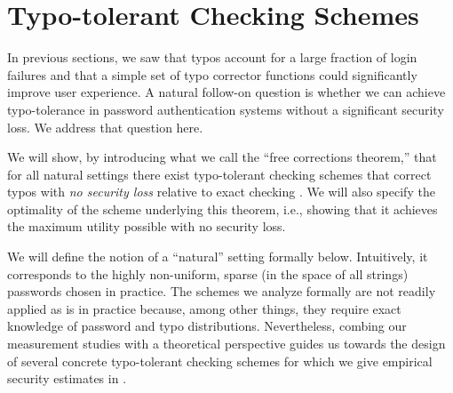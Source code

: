 \section{Typo-tolerant Checking Schemes}
\label{sec:formal}
\def\shift{\ensuremath{\langle s \rangle}}
\def\caps{\ensuremath{\langle c \rangle}}


In previous sections, we saw that typos account for a large fraction
of login failures and that a simple set of typo corrector functions
could significantly improve user experience. A natural follow-on
question is whether we can achieve typo-tolerance in password
authentication systems without a significant security loss.  We
address that question here.

We will show, by introducing what we call the ``free corrections
theorem,'' that for all natural settings there exist typo-tolerant
checking schemes that correct typos with \emph{no security loss}
relative to exact checking .  We will also specify the optimality of the scheme
underlying this theorem, i.e., showing that it achieves the maximum
utility possible with no security loss.

We will define the notion of a ``natural'' setting formally below. Intuitively, it corresponds to the
highly non-uniform, sparse (in the space of all strings) passwords chosen in practice.
The schemes we analyze formally are not readily applied as is in practice because, among other
things, they require exact knowledge of password and typo distributions.
Nevertheless, combing our measurement studies with a theoretical perspective guides us towards the design
of several concrete typo-tolerant checking schemes for which we give empirical
security estimates in . 


